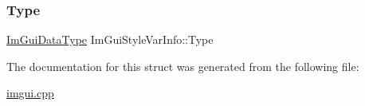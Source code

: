 \mbox{\label{struct_im_gui_style_var_info_a62f42d2bb7b71b7530493e16e622cb81}} 
\subsubsection{\texorpdfstring{Type}{Type}}
{\footnotesize\ttfamily \mbox{\hyperlink{imgui_8h_a4cfa8697a3d76722fff83eb18922e9d5}{Im\+Gui\+Data\+Type}} Im\+Gui\+Style\+Var\+Info\+::\+Type}



The documentation for this struct was generated from the following file\+:\begin{DoxyCompactItemize}
\item 
\mbox{\hyperlink{imgui_8cpp}{imgui.\+cpp}}\end{DoxyCompactItemize}
